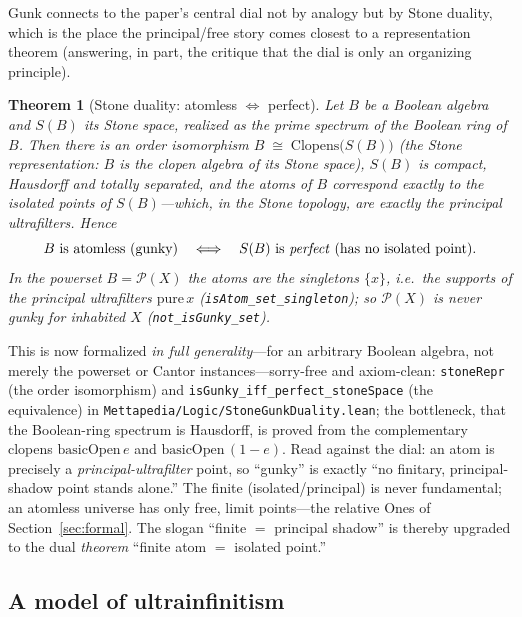 \documentclass[]{article}
\newtheorem{theorem}{Theorem}
\theoremstyle{definition}
\theoremstyle{remark}
\newcommand{\code}[1]{\texttt{#1}}
\newcommand{\lpath}[1]{{\ttfamily\nolinkurl{#1}}}
\begin{document}
Gunk connects to the paper's central dial not by analogy but by Stone duality, which
is the place the principal/free story comes closest to a representation theorem
(answering, in part, the critique that the dial is only an organizing principle).

\begin{theorem}[Stone duality: atomless $\Leftrightarrow$ perfect]
\label{prop:stone}
Let $B$ be a Boolean algebra and $S(B)$ its Stone space, realized as the prime spectrum
of the Boolean ring of $B$. Then there is an order isomorphism
$B\;\cong\;\mathrm{Clopens}\bigl(S(B)\bigr)$ (the \emph{Stone representation}: $B$ is the
clopen algebra of its Stone space), $S(B)$ is compact, Hausdorff and totally separated,
and the \emph{atoms} of $B$ correspond exactly to the \emph{isolated points} of
$S(B)$---which, in the Stone topology, are exactly the \emph{principal} ultrafilters.
Hence
\[
  B \text{ is atomless (gunky)}
  \quad\Longleftrightarrow\quad
  S(B) \text{ is \emph{perfect} (has no isolated point).}
\]
In the powerset $B=\mathcal P(X)$ the atoms are the singletons $\{x\}$, i.e.\ the
supports of the principal ultrafilters $\mathrm{pure}\,x$ (\code{isAtom\_set\_singleton});
so $\mathcal P(X)$ is never gunky for inhabited $X$ (\code{not\_isGunky\_set}).
\end{theorem}

This is now formalized \emph{in full generality}---for an arbitrary Boolean algebra,
not merely the powerset or Cantor instances---sorry-free and axiom-clean:
\code{stoneRepr} (the order isomorphism) and \code{isGunky\_iff\_perfect\_stoneSpace}
(the equivalence) in \lpath{Mettapedia/Logic/StoneGunkDuality.lean}; the bottleneck, that
the Boolean-ring spectrum is Hausdorff, is proved from the complementary clopens
$\mathrm{basicOpen}\,e$ and $\mathrm{basicOpen}\,(1-e)$. Read against the dial: an atom is
precisely a \emph{principal-ultrafilter} point, so ``gunky'' is exactly ``no finitary,
principal-shadow point stands alone.'' The finite (isolated/principal) is never
fundamental; an atomless universe has only free, limit points---the relative Ones of
Section~\ref{sec:formal}. The slogan ``finite $=$ principal shadow'' is thereby upgraded
to the dual \emph{theorem} ``finite atom $=$ isolated point.''

\subsection{A model of ultrainfinitism}
\label{sec:model}
\end{document}
